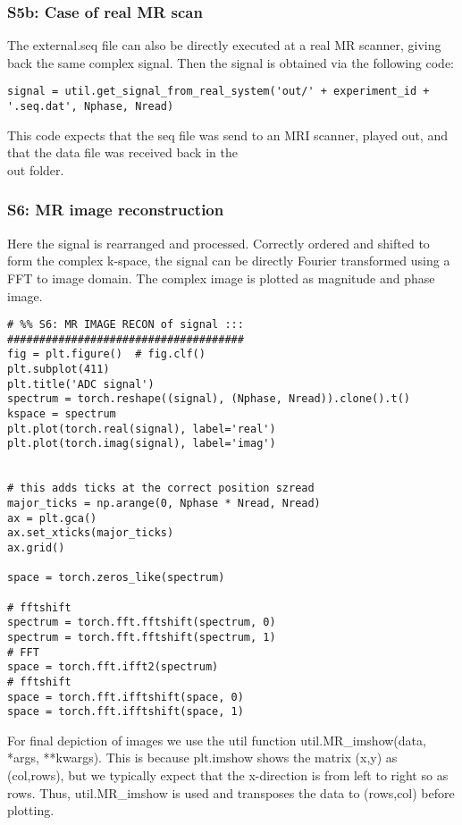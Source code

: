 \documentclass[a4paper,12pt]{extarticle}
\begin{document}
\subsubsection{S5b: Case of real MR scan}
The external.seq file can also be directly executed at a real MR scanner, giving back the same complex signal. Then the signal is obtained via the following code:

\begin{verbatim}
signal = util.get_signal_from_real_system('out/' + experiment_id + '.seq.dat', Nphase, Nread)
\end{verbatim}
This code expects that the seq file was send to an MRI scanner, played out, and that the data file was received back in the \\out folder.

\subsubsection{S6: MR image reconstruction}
Here the signal is rearranged and processed.
Correctly ordered and shifted to form the complex k-space, the signal can be directly Fourier transformed using a FFT to image domain.
The complex image is plotted as magnitude and phase image.

\begin{verbatim}
# %% S6: MR IMAGE RECON of signal ::: #####################################
fig = plt.figure()  # fig.clf()
plt.subplot(411)
plt.title('ADC signal')
spectrum = torch.reshape((signal), (Nphase, Nread)).clone().t()
kspace = spectrum
plt.plot(torch.real(signal), label='real')
plt.plot(torch.imag(signal), label='imag')


# this adds ticks at the correct position szread
major_ticks = np.arange(0, Nphase * Nread, Nread)
ax = plt.gca()
ax.set_xticks(major_ticks)
ax.grid()

space = torch.zeros_like(spectrum)

# fftshift
spectrum = torch.fft.fftshift(spectrum, 0)
spectrum = torch.fft.fftshift(spectrum, 1)
# FFT
space = torch.fft.ifft2(spectrum)
# fftshift
space = torch.fft.ifftshift(space, 0)
space = torch.fft.ifftshift(space, 1)

\end{verbatim}

For final depiction of images we use the util function util.MR\_imshow(data, *args, **kwargs). This is because plt.imshow shows the matrix (x,y) as (col,rows), but we typically expect that the x-direction is from left to right so as rows. Thus, util.MR\_imshow is used and transposes the data to (rows,col) before plotting.
\end{document}
